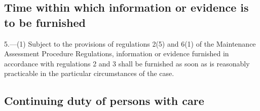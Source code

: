 \documentclass[a4paper,12pt]{article}
\begin{document}
%

\subsection[5. Time within which information or evidence is to be furnished]{Time within which information or evidence is to be furnished}

5.—(1) Subject to 
the provisions of regulations 2(5)
 and 6(1)   %
of the Maintenance Assessment Procedure Regulations, information or evidence furnished in accordance with regulations 2 and 3 shall be furnished as soon as is reasonably practicable in the particular circumstances of the case.



\subsection[6. Continuing duty of persons with care]{Continuing duty of persons with care}
\end{document}
